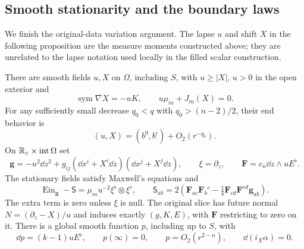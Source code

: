 \subsection{Smooth stationarity and the boundary laws}

We finish the original-data variation argument.  The lapse $u$ and
shift $X$ in the following proposition are the measure moments
constructed above; they are unrelated to the lapse notation used
locally in the filled scalar construction.

\begin{proposition}
\label{var:stationary-data}
\label{var:stationary-development}
There are smooth fields $u,X$ on $\Omega$, including $S$, with
$u\ge |X|$, $u>0$ in the open exterior and
\begin{equation}
 \operatorname{sym}\nabla X=-uK,\qquad
 u\mu_m+J_m(X)=0.
 \label{var:smooth-kid-complementarity}
\end{equation}
For any sufficiently small decrease $q_0<q$ with
$q_0>(n-2)/2$, their end behavior is
\begin{equation}
 (u,X)=(b^0,b^i)+O_2(r^{-q_0}).
 \label{var:lapse-shift-end}
\end{equation}
On $\mathbb R_z\times\operatorname{int}\Omega$ set
\begin{equation}
 \mathbf g=-u^2\dd z^2+
             g_{ij}(\dd x^i+X^i\dd z)(\dd x^j+X^j\dd z),
 \qquad \xi=\partial_z,\qquad
 \mathbf F=c_n\dd z\wedge uE^\flat.
 \label{var:stationary-product}
\end{equation}
The stationary fields satisfy Maxwell's equations and
\begin{equation}
 \operatorname{Ein}_{\mathbf g}-\mathsf S
       =\mu_m u^{-2}\xi^\flat\otimes\xi^\flat,
 \qquad
 \mathsf S_{ab}=2\left(\mathbf F_{ac}\mathbf F_b{}^c
           -\tfrac14\mathbf F_{cd}\mathbf F^{cd}\mathbf g_{ab}\right).
 \label{var:stationary-einstein}
\end{equation}
The extra term is zero unless $\xi$ is null.  The original slice
has future normal $N=(\partial_z-X)/u$ and induces exactly
$(g,K,E)$, with $\mathbf F$ restricting to zero on it.
There is a global smooth function $p$, including up to $S$, with
\begin{equation}
 \dd p=(k-1)uE^\flat,
 \qquad p(\infty)=0,
 \qquad p=O_2(r^{2-n}),
 \qquad \dd(i_X\alpha)=0.
 \label{var:potential-maxwell}
\end{equation}


\end{proposition}
